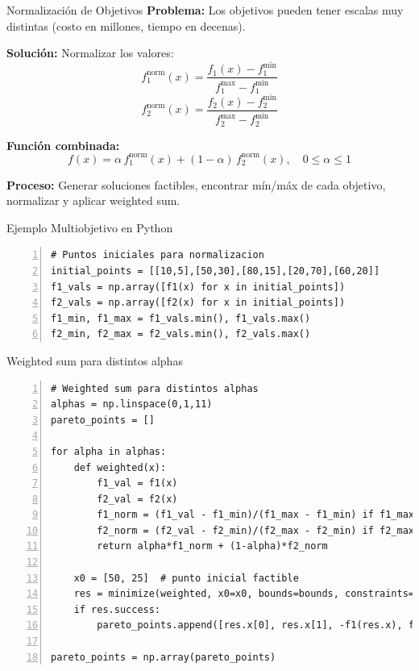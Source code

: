 \documentclass{beamer}
\begin{document}
\begin{frame}{Normalización de Objetivos}
    \textbf{Problema:} Los objetivos pueden tener escalas muy distintas (costo en millones, tiempo en decenas).
    
    \textbf{Solución:} Normalizar los valores:
    \[f_1^{\text{norm}}(x) = \frac{f_1(x) - f_1^{\min}}{f_1^{\max} - f_1^{\min}}\]
    \[f_2^{\text{norm}}(x) = \frac{f_2(x) - f_2^{\min}}{f_2^{\max} - f_2^{\min}}\]
    
    \textbf{Función combinada:}
    \[f(x) = \alpha \, f_1^{\text{norm}}(x) + (1-\alpha) \, f_2^{\text{norm}}(x), \quad 0 \leq \alpha \leq 1\]
    
    \textbf{Proceso:} Generar soluciones factibles, encontrar mín/máx de cada objetivo, normalizar y aplicar weighted sum.
\end{frame}

\begin{frame}[fragile]{Ejemplo Multiobjetivo en Python}
    \begin{lstlisting}[numbers=left, numbersep=5pt]
# Puntos iniciales para normalizacion
initial_points = [[10,5],[50,30],[80,15],[20,70],[60,20]]
f1_vals = np.array([f1(x) for x in initial_points])
f2_vals = np.array([f2(x) for x in initial_points])
f1_min, f1_max = f1_vals.min(), f1_vals.max()
f2_min, f2_max = f2_vals.min(), f2_vals.max()
    \end{lstlisting}
\end{frame}

\begin{frame}[fragile]{Weighted sum para distintos alphas}
    \begin{lstlisting}[numbers=left, numbersep=5pt]
# Weighted sum para distintos alphas
alphas = np.linspace(0,1,11)
pareto_points = []

for alpha in alphas:
    def weighted(x):
        f1_val = f1(x)
        f2_val = f2(x)
        f1_norm = (f1_val - f1_min)/(f1_max - f1_min) if f1_max!=f1_min else 0
        f2_norm = (f2_val - f2_min)/(f2_max - f2_min) if f2_max!=f2_min else 0
        return alpha*f1_norm + (1-alpha)*f2_norm

    x0 = [50, 25]  # punto inicial factible
    res = minimize(weighted, x0=x0, bounds=bounds, constraints=cons, method='SLSQP')
    if res.success:
        pareto_points.append([res.x[0], res.x[1], -f1(res.x), f2(res.x)])

pareto_points = np.array(pareto_points)
    \end{lstlisting}

\end{frame}
\end{document}
